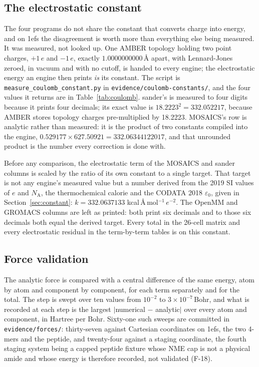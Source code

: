 \subsection{The electrostatic constant}
\label{sec:methods-coulomb}

The four programs do not share the constant that converts charge into energy,
and on 1efs the disagreement is worth more than everything else being measured.
It was measured, not looked up. One AMBER topology holding two point charges,
$+1\,e$ and $-1\,e$, exactly $1.0000000000$\,\AA{} apart, with Lennard-Jones
zeroed, in vacuum and with no cutoff, is handed to every engine; the
electrostatic energy an engine then prints \emph{is} its constant. The script
is \texttt{measure\_coulomb\_constant.py} in
\texttt{evidence/coulomb-constants/}, and the four values it returns are in
Table~\ref{tab:coulomb}. sander's is measured to four digits because it prints
four decimals; its exact value is $18.2223^2 = 332.052217$, because AMBER
stores topology charges pre-multiplied by 18.2223. MOSAICS's row is analytic
rather than measured: it is the product of two constants compiled into the
engine, $0.529177\times627.50921 = 332.06344122017$, and that unrounded product
is the number every correction is done with.

Before any comparison, the electrostatic term of the MOSAICS and sander columns
is scaled by the ratio of its own constant to a single target. That target is
not any engine's measured value but a number derived from the 2019 SI values of
$e$ and $N_{\mathrm{A}}$, the thermochemical calorie and the CODATA 2018
$\varepsilon_{0}$, given in Section~\ref{sec:constant}: $k = 332.0637133$
kcal\,\AA\,mol$^{-1}$\,$e^{-2}$. The OpenMM and GROMACS columns are left as
printed: both print six decimals and to those six decimals both equal the
derived target. Every total in the 26-cell matrix and every electrostatic
residual in the term-by-term tables is on this constant.

\subsection{Force validation}
\label{sec:methods-forces}

The analytic force is compared with a central difference of the same energy,
atom by atom and component by component, for each term separately and for the
total. The step is swept over ten values from $10^{-2}$ to
$3\times10^{-7}$\,Bohr, and what is recorded at each step is the largest
$|$numerical $-$ analytic$|$ over every atom and component, in Hartree per
Bohr. Sixty-one such sweeps are committed in \texttt{evidence/forces/}:
thirty-seven against Cartesian coordinates on 1efs, the two 4-mers and the
peptide, and twenty-four against a staging coordinate, the fourth staging
system being a capped peptide fixture whose NME cap is not a physical amide and
whose energy is therefore recorded, not validated (F-18).

